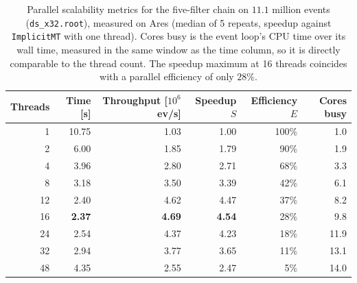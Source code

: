 \begin{table}[htbp]
\centering
\caption{Parallel scalability metrics for the five-filter chain on $11.1$ million events (\texttt{ds\_x32.root}), measured on Ares (median of 5 repeats, speedup against \texttt{ImplicitMT} with one thread). Cores busy is the event loop's CPU time over its wall time, measured in the same window as the time column, so it is directly comparable to the thread count. The speedup maximum at 16 threads coincides with a parallel efficiency of only $28\%$.}
\label{tab:scalability-chain}
\begin{tabular}{rrrrrr}
\toprule
Threads & Time [s] & Throughput [$10^6$ ev/s] & Speedup $S$ & Efficiency $E$ & Cores busy \\
\midrule
 1 & 10.75 & 1.03 & 1.00 & 100\% & 1.0 \\
 2 & 6.00 & 1.85 & 1.79 & 90\% & 1.9 \\
 4 & 3.96 & 2.80 & 2.71 & 68\% & 3.3 \\
 8 & 3.18 & 3.50 & 3.39 & 42\% & 6.1 \\
12 & 2.40 & 4.62 & 4.47 & 37\% & 8.2 \\
16 & \textbf{2.37} & \textbf{4.69} & \textbf{4.54} & 28\% & 9.8 \\
24 & 2.54 & 4.37 & 4.23 & 18\% & 11.9 \\
32 & 2.94 & 3.77 & 3.65 & 11\% & 13.1 \\
48 & 4.35 & 2.55 & 2.47 & 5\% & 14.0 \\
\bottomrule
\end{tabular}
\end{table}
